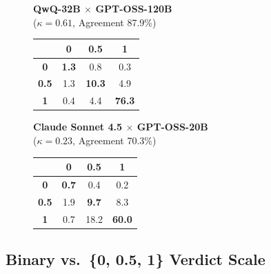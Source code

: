 \begin{figure}[!htbp]
\centering
\small
\setlength{\tabcolsep}{4pt}
\renewcommand{\arraystretch}{1.1}

\begin{minipage}[t]{0.45\linewidth}
\centering
\textbf{QwQ-32B $\times$ GPT-OSS-120B}\\
{\scriptsize ($\kappa=0.61$, Agreement 87.9\%)}

\vspace{4pt}

\begin{tabular}{c|ccc}
\toprule
 & \textbf{0} & \textbf{0.5} & \textbf{1} \\
\midrule
\textbf{0}   & \cellcolor{gray!15}\textbf{1.3} & 0.8 & 0.3 \\
\textbf{0.5} & 1.3 & \cellcolor{gray!15}\textbf{10.3} & 4.9 \\
\textbf{1}   & 0.4 & 4.4 & \cellcolor{gray!15}\textbf{76.3} \\
\bottomrule
\end{tabular}
\end{minipage}
\hfill
\begin{minipage}[t]{0.45\linewidth}
\centering
\textbf{Claude Sonnet 4.5 $\times$ GPT-OSS-20B}\\
{\scriptsize ($\kappa=0.23$, Agreement 70.3\%)}

\vspace{4pt}

\begin{tabular}{c|ccc}
\toprule
 & \textbf{0} & \textbf{0.5} & \textbf{1} \\
\midrule
\textbf{0}   & \cellcolor{gray!15}\textbf{0.7} & 0.4 & 0.2 \\
\textbf{0.5} & 1.9 & \cellcolor{gray!15}\textbf{9.7} & 8.3 \\
\textbf{1}   & 0.7 & 18.2 & \cellcolor{gray!15}\textbf{60.0} \\
\bottomrule
\end{tabular}
\end{minipage}

\label{tab:confusion-full}
\end{figure}

\subsection*{Binary vs.\ \{0, 0.5, 1\} Verdict Scale}
\label{app:abl-binary}

